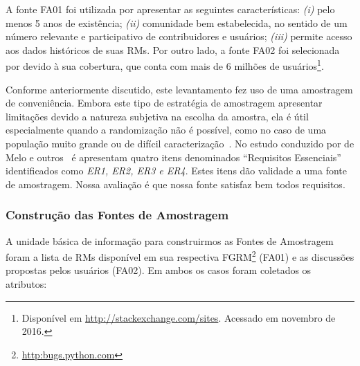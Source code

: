 A fonte FA01 foi utilizada por apresentar as seguintes características:
\textit{(i)} pelo menos 5 anos de existência; \textit{(ii)} comunidade bem
estabelecida, no sentido de um número relevante e participativo de
contribuidores e usuários; \textit{(iii)} permite acesso aos dados históricos de
suas RMs. Por outro lado, a fonte FA02 foi selecionada por devido à sua
cobertura, que conta com mais de 6 milhões de usuários\footnote{Disponível em
	\url{http://stackexchange.com/sites}. Acessado em novembro de 2016.}.

Conforme anteriormente discutido, este levantamento fez uso de uma amostragem de
conveniência. Embora este tipo de estratégia de amostragem apresentar limitações
devido a natureza subjetiva na escolha da amostra, ela é útil especialmente
quando a randomização não é possível, como no caso de uma população muito grande
ou de difícil caracterização~\cite{boxill1997introduction}. No estudo conduzido
por de Melo e outros~\cite{de2014towards} é apresentam quatro itens denominados
``Requisitos Essenciais'' identificados como \textit{ER1, ER2, ER3 e ER4}. Estes
itens dão validade a uma fonte de amostragem. Nossa avaliação é que nossa fonte
satisfaz bem todos requisitos.



\subsubsection{Construção das Fontes de Amostragem}
\label{subsubsec:construcao_fonte_amostragem}

A unidade básica de informação para construirmos as Fontes de Amostragem foram a
lista de RMs disponível em sua respectiva
FGRM\footnote{\url{http:bugs.python.com}} (FA01) e as discussões propostas pelos
usuários (FA02). Em ambos os casos foram coletados os atributos:

